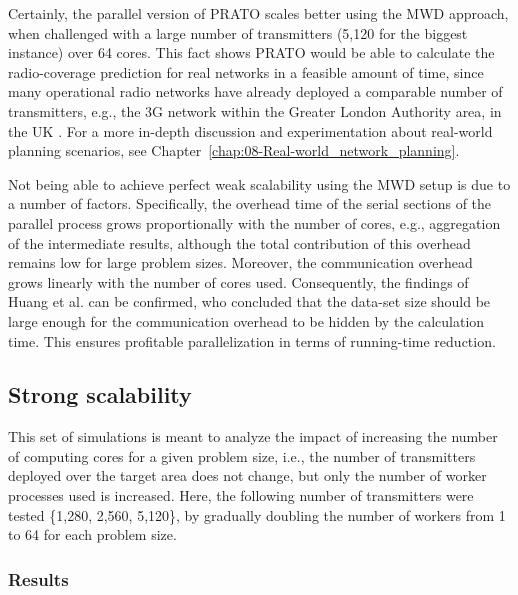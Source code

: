 Certainly, the parallel version of PRATO scales better using the MWD
approach, when challenged with a large number of transmitters (5,120
for the biggest instance) over 64 cores. This fact shows PRATO would
be able to calculate the radio-coverage prediction for real networks
in a feasible amount of time, since many operational radio networks
have already deployed a comparable number of transmitters, e.g., the
3G network within the Greater London Authority area, in the UK \cite{Number_of_base_stations_in_England}.
For a more in-depth discussion and experimentation about real-world
planning scenarios, see Chapter~\ref{chap:08-Real-world_network_planning}.

Not being able to achieve perfect weak scalability using the MWD setup
is due to a number of factors. Specifically, the overhead time of
the serial sections of the parallel process grows proportionally with
the number of cores, e.g., aggregation of the intermediate results,
although the total contribution of this overhead remains low for large
problem sizes. Moreover, the communication overhead grows linearly
with the number of cores used. Consequently, the findings of Huang
et al. \cite{Huang-Explorations_of_the_implementation_of_a_parallel_IDW_algorithm_in_a_Linux_cluster:2011}
can be confirmed, who concluded that the data-set size should be large
enough for the communication overhead to be hidden by the calculation
time. This ensures profitable parallelization in terms of running-time
reduction.


\subsection{Strong scalability \label{sub:04-Strong_scalability}}

This set of simulations is meant to analyze the impact of increasing
the number of computing cores for a given problem size, i.e., the
number of transmitters deployed over the target area does not change,
but only the number of worker processes used is increased. Here, the
following number of transmitters were tested \{1,280, 2,560, 5,120\},
by gradually doubling the number of workers from 1 to 64 for each
problem size.


\subsubsection{Results}

